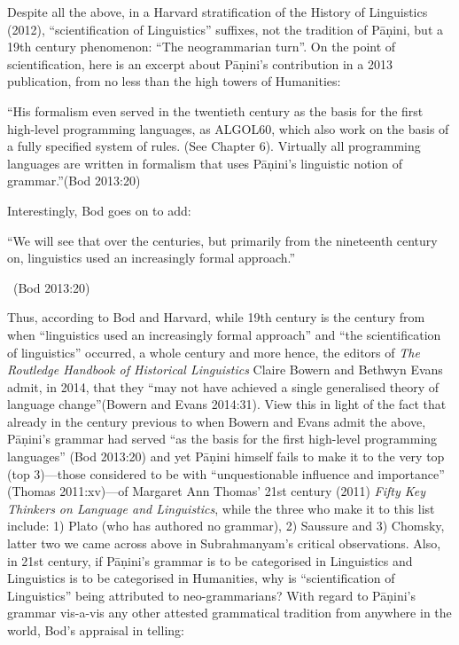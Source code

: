 Despite all the above, in a Harvard stratification of the History of Linguistics (2012), “scientification of Linguistics” suffixes, not the tradition of Pāṇini, but a 19th century phenomenon: “The neogrammarian turn”. On the point of scientification, here is an excerpt about Pāṇini’s contribution in a 2013 publication, from no less than the high towers of Humanities:

\begin{myquote}
“His formalism even served in the twentieth century as the basis for the first high-level programming languages, as ALGOL60, which also work on the basis of a fully specified system of rules. (See Chapter 6). Virtually all programming languages are written in formalism that uses Pāṇini’s linguistic notion of grammar.”\hfill (Bod 2013:20)
\end{myquote}

Interestingly, Bod goes on to add:

\begin{myquote}
“We will see that over the centuries, but primarily from the nineteenth century on, linguistics used an increasingly formal approach.”

~\hfill (Bod 2013:20)
\end{myquote}

Thus, according to Bod and Harvard, while 19th century is the century from when “linguistics used an increasingly formal approach” and “the scientification of linguistics” occurred, a whole century and more hence, the editors of \textit{The Routledge Handbook of Historical Linguistics} Claire Bowern and Bethwyn Evans admit, in 2014, that they “may not have achieved a single generalised theory of language change”(Bowern and Evans 2014:31). View this in light of the fact that already in the century previous to when Bowern and Evans admit the above, Pāṇini’s grammar had served “as the basis for the first high-level programming languages” (Bod 2013:20) and yet Pāṇini himself fails to make it to the very top (top 3)—those considered to be with “unquestionable influence and importance” (Thomas 2011:xv)—of Margaret Ann Thomas’ 21st century (2011) \textit{Fifty Key Thinkers on Language and Linguistics}, while the three who make it to this list include: 1) Plato (who has authored no grammar), 2) Saussure and 3) Chomsky, latter two we came across above in Subrahmanyam’s critical observations. Also, in 21st century, if Pāṇini’s grammar is to be categorised in Linguistics and Linguistics is to be categorised in Humanities, why is “scientification of Linguistics” being attributed to neo-grammarians? With regard to Pāṇini’s grammar vis-a-vis any other attested grammatical tradition from anywhere in the world, Bod’s appraisal in telling:

